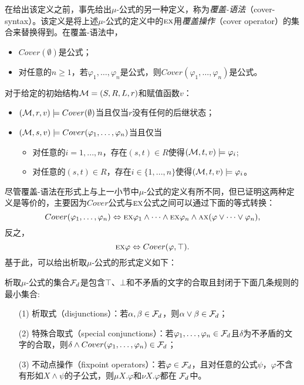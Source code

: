 在给出该定义之前，事先给出$\mu$-公式的另一种定义，称为\emph{覆盖-语法}（cover-syntax）。该定义是将上述$\mu$-公式的定义中的$\textsc{e}\textsc{x}$用\emph{覆盖操作}（cover operator）的集合来替换得到。在覆盖-语法中，
\begin{itemize}
	\item $Cover(\emptyset)$是公式；
	\item 对任意的$n\geq 1$，若$\varphi_1,\dots, \varphi_n$是公式，则$Cover(\varphi_1, \dots, \varphi_n)$是公式。
\end{itemize}
对于给定的初始结构${\cal M}=(S,R,L,r)$和赋值函数$v$：
\begin{itemize}
	\item $({\cal M},r,v) \models Cover(\emptyset)$当且仅当$r$没有任何的后继状态；
	\item $({\cal M}, s,v ) \models Cover(\varphi_1, \dots, \varphi_n)$当且仅当
	\begin{itemize}
		\item 对任意的$i = 1, . . . , n$，存在$(s, t) \in R$使得$({\cal M}, t,v) \models \varphi_i$;
		\item 对任意的$(s, t) \in R$，存在$i\in \{1, . . . , n\}$使得$({\cal M}, t,v) \models \varphi_i$。
	\end{itemize}
\end{itemize}

尽管覆盖-语法在形式上与上一小节中$\mu$-公式的定义有所不同，但已证明这两种定义是等价的\cite{d2006modal}，主要因为$Cover$公式与$\textsc{e}\textsc{x}$公式之间可以通过下面的等式转换：
\[
Cover(\varphi_1, \dots, \varphi_n) \Leftrightarrow \textsc{e}\textsc{x} \varphi_1 \wedge \dots \wedge \textsc{e}\textsc{x} \varphi_n \wedge \textsc{a}\textsc{x}(\varphi \vee \dots \vee \varphi_n),
\]
反之，
\[
\textsc{e}\textsc{x} \varphi \Leftrightarrow Cover(\varphi, \top).
\]
基于此，可以给出析取$\mu$-公式的形式定义如下：
\begin{definition}
	析取$\mu$-公式的集合${\cal F}_d$是包含$\top$、$\bot$和不矛盾的文字的合取且封闭于下面几条规则的最小集合:
	\begin{itemize}
		\item[(1)] 析取式（disjunctions）：若$\alpha, \beta \in {\cal F}_d$，则$\alpha \vee \beta \in {\cal F}_d$；
		\item[(2)] 特殊合取式（special conjunctions）：若$\varphi_1, \dots, \varphi_n\in {\cal F}_d$且$\delta$为不矛盾的文字的合取，则$\delta \wedge Cover(\varphi_1, \dots, \varphi_n) \in {\cal F}_d$；
		\item[(3)] 不动点操作（fixpoint operators）：若$\varphi\in  {\cal F}_d$，且对任意的公式$\psi$，$\varphi$不含有形如$X \wedge \psi$的子公式，则$\mu X. \varphi$和$\nu X. \varphi$都在 ${\cal F}_d$中。
	\end{itemize}	
\end{definition}

